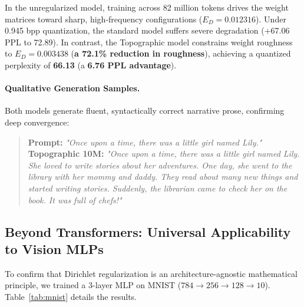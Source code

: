 \documentclass[11pt,a4paper]{article}
\begin{document}
\begin{table}[h]
    \centering
    \small
    \caption{\textbf{Converged 10,000-Step Publication Training on TinyStories 10M (NVIDIA A10G).}}
    \label{tab:10k_results}
\end{table}

In the unregularized model, training across 82 million tokens drives the weight matrices toward sharp, high-frequency configurations ($E_D = 0.012316$). Under 0.945 bpp quantization, the standard model suffers severe degradation (+67.06 PPL to 72.89). In contrast, the Topographic model constrains weight roughness to $E_D = 0.003438$ (\textbf{a 72.1\% reduction in roughness}), achieving a quantized perplexity of \textbf{66.13} (a \textbf{6.76 PPL advantage}).

\paragraph{Qualitative Generation Samples.} Both models generate fluent, syntactically correct narrative prose, confirming deep convergence:
\begin{quote}
    \textbf{Prompt:} \textit{"Once upon a time, there was a little girl named Lily."}\\
    \textbf{Topographic 10M:} \textit{"Once upon a time, there was a little girl named Lily. She loved to write stories about her adventures. One day, she went to the library with her mommy and daddy. They read about many new things and started writing stories. Suddenly, the librarian came to check her on the book. It was full of chefs!"}
\end{quote}

\subsection{Beyond Transformers: Universal Applicability to Vision MLPs}
To confirm that Dirichlet regularization is an architecture-agnostic mathematical principle, we trained a 3-layer MLP on MNIST ($784 \to 256 \to 128 \to 10$). Table~\ref{tab:mnist} details the results.
\end{document}
